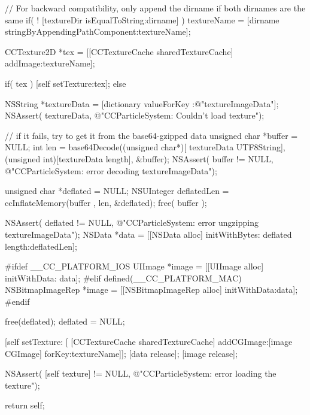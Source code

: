\begin{DoxyCode}
{{{                        // For backward compatibility, only append the dirname
       if both dirnames are the same
                        if( ! [textureDir isEqualToString:dirname] )
                                textureName = [dirname 
      stringByAppendingPathComponent:textureName];

                        CCTexture2D *tex = [[CCTextureCache sharedTextureCache]
       addImage:textureName];

                        if( tex )
                                [self setTexture:tex];
                        else {

                                NSString *textureData = [dictionary valueForKey
      :@"textureImageData"];
                                NSAssert( textureData, @"CCParticleSystem:
       Couldn't load texture");

                                // if it fails, try to get it from the
       base64-gzipped data
                                unsigned char *buffer = NULL;
                                int len = base64Decode((unsigned char*)[
      textureData UTF8String], (unsigned int)[textureData length], &buffer);
                                NSAssert( buffer != NULL, @"CCParticleSystem:
       error decoding textureImageData");

                                unsigned char *deflated = NULL;
                                NSUInteger deflatedLen = ccInflateMemory(buffer
      , len, &deflated);
                                free( buffer );

                                NSAssert( deflated != NULL, @"CCParticleSystem:
       error ungzipping textureImageData");
                                NSData *data = [[NSData alloc] initWithBytes:
      deflated length:deflatedLen];

#ifdef __CC_PLATFORM_IOS
                                UIImage *image = [[UIImage alloc] initWithData:
      data];
#elif defined(__CC_PLATFORM_MAC)
                                NSBitmapImageRep *image = [[NSBitmapImageRep 
      alloc] initWithData:data];
#endif

                                free(deflated); deflated = NULL;

                                [self setTexture:  [ [CCTextureCache 
      sharedTextureCache] addCGImage:[image CGImage] forKey:textureName]];
                                [data release];
                                [image release];
                        }

                        NSAssert( [self texture] != NULL, @"CCParticleSystem:
       error loading the texture");
                }
        }

        return self;
}
\end{DoxyCode}
